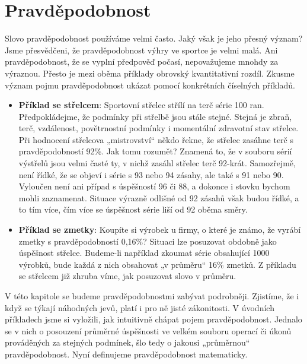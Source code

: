   \section{Pravděpodobnost}\label{mai:IchapIVsecII}
    Slovo pravděpodobnost používáme velmi často. Jaký však je jeho přesný význam? Jsme přesvědčeni, 
    že pravděpodobnost výhry ve sportce je velmi malá. Ani pravděpodobnost, že se vyplní předpověď 
    počasí, nepovažujeme mnohdy za výraznou. Přesto je mezi oběma příklady obrovský kvantitativní 
    rozdíl. Zkusme význam pojmu pravděpodobnost ukázat pomocí konkrétních číselných příkladů.
  
    \begin{itemize}[noitemsep]
      \item \textbf{Příklad se střelcem}: Sportovní střelec střílí na terč série \num{100} ran. 
            Předpokládejme, že podmínky při střelbě jsou stále stejné. Stejná je zbraň, terč, 
            vzdálenost, povětrnostní podmínky i momentální zdravotní stav střelce. Při hodnocení 
            střelcova „mistrovství“ někdo řekne, že střelec zasáhne terč s pravděpodobností 
            \num{92}\%. Jak tomu rozumět? Znamená to, že v souboru sérií výstřelů jsou velmi časté 
            ty, v nichž zasáhl střelec terč \num{92}-krát. Samozřejmě, není řídké, že se objeví i 
            série s \num{93} nebo \num{94} zásahy, ale také s \num{91} nebo \num{90}. Vyloučen není 
            ani případ s úspěšností \num{96} či \num{88}, a dokonce i stovku bychom mohli 
            zaznamenat. Situace výrazně odlišné od \num{92} zásahů však budou řídké, a to tím více, 
            čím více se úspěšnost série liší od \num{92} oběma směry.
      \item \textbf{Příklad se zmetky}: Koupíte si výrobek u firmy, o které je známo, že vyrábí 
            zmetky s pravděpodobností 0,16\%? Situaci lze posuzovat obdobně jako úspěšnost střelce. 
            Budeme-li například zkoumat série obsahující 1000 výrobků, bude každá z nich obsahovat 
            „v průměru“ 16\% zmetků. Z příkladu se střelcem již zhruba víme, jak posuzovat slovo v 
            průměru.
    \end{itemize}
    
    V této kapitole se budeme pravděpodobnostmi zabývat podrobněji. Zjistíme, že i když se týkají 
    náhodných jevů, platí i pro ně jisté zákonitosti. V úvodních příkladech jsme si vyložili, jak 
    intuitivně chápat pojem pravděpodobnost. Jednalo se v nich o posouzení průměrné úspěšnosti ve 
    velkém souboru operací či úkonů prováděných za stejných podmínek, šlo tedy o jakousi 
    „průměrnou“ pravděpodobnost. Nyní definujeme pravděpodobnost matematicky.
    
